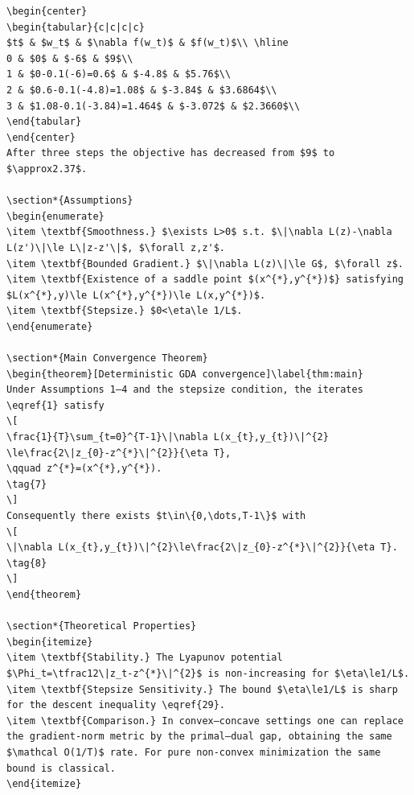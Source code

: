 {{\begin{verbatim}
\begin{center}
\begin{tabular}{c|c|c|c}
$t$ & $w_t$ & $\nabla f(w_t)$ & $f(w_t)$\\ \hline
0 & $0$ & $-6$ & $9$\\
1 & $0-0.1(-6)=0.6$ & $-4.8$ & $5.76$\\
2 & $0.6-0.1(-4.8)=1.08$ & $-3.84$ & $3.6864$\\
3 & $1.08-0.1(-3.84)=1.464$ & $-3.072$ & $2.3660$\\
\end{tabular}
\end{center}
After three steps the objective has decreased from $9$ to $\approx2.37$.

\section*{Assumptions}
\begin{enumerate}
\item \textbf{Smoothness.} $\exists L>0$ s.t. $\|\nabla L(z)-\nabla L(z')\|\le L\|z-z'\|$, $\forall z,z'$.
\item \textbf{Bounded Gradient.} $\|\nabla L(z)\|\le G$, $\forall z$.
\item \textbf{Existence of a saddle point $(x^{*},y^{*})$} satisfying $L(x^{*},y)\le L(x^{*},y^{*})\le L(x,y^{*})$.
\item \textbf{Stepsize.} $0<\eta\le 1/L$.
\end{enumerate}

\section*{Main Convergence Theorem}
\begin{theorem}[Deterministic GDA convergence]\label{thm:main}
Under Assumptions 1–4 and the stepsize condition, the iterates \eqref{1} satisfy
\[
\frac{1}{T}\sum_{t=0}^{T-1}\|\nabla L(x_{t},y_{t})\|^{2}
\le\frac{2\|z_{0}-z^{*}\|^{2}}{\eta T},
\qquad z^{*}=(x^{*},y^{*}).
\tag{7}
\]
Consequently there exists $t\in\{0,\dots,T-1\}$ with
\[
\|\nabla L(x_{t},y_{t})\|^{2}\le\frac{2\|z_{0}-z^{*}\|^{2}}{\eta T}.
\tag{8}
\]
\end{theorem}

\section*{Theoretical Properties}
\begin{itemize}
\item \textbf{Stability.} The Lyapunov potential $\Phi_t=\tfrac12\|z_t-z^{*}\|^{2}$ is non‑increasing for $\eta\le1/L$.
\item \textbf{Stepsize Sensitivity.} The bound $\eta\le1/L$ is sharp for the descent inequality \eqref{29}.
\item \textbf{Comparison.} In convex–concave settings one can replace the gradient‑norm metric by the primal–dual gap, obtaining the same $\mathcal O(1/T)$ rate. For pure non‑convex minimization the same bound is classical.
\end{itemize}


\end{verbatim}}}
